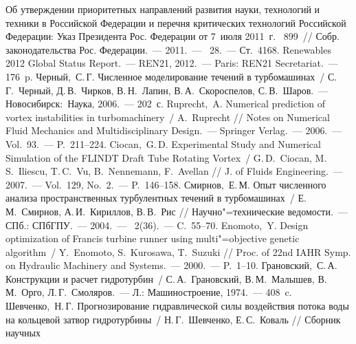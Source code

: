 \begin{thebibliography}{999}
\baselineskip 21pt

\Rus
{}Об утверждении приоритетных направлений развития науки, технологий и техники в 
                Российской Федерации и перечня критических технологий Российской Федерации: Указ 
                Президента Рос. Федерации от 7~июля 2011~г. \No~899~// Собр. законодательства Рос. 
                Федерации.~--- 2011.~--- \No~28.~--- Ст.~4168.
\Eng
{}Renewables 2012 Global Status Report.~--- REN21, 2012.~--- Paris: 
                REN21 Secretariat.~--- 176~p. 
%
\Rus
{}  Черный,~С.\,Г. Численное моделирование течений в турбомашинах~/ С.\,Г.~Черный, Д.\,В.~Чирков, 
                В.\,Н.~Лапин, В.\,А.~Скороспелов, С.\,В.~Шаров.~--- Новосибирск:~Наука, 2006.~--- 202~с.
%
\Eng
{}  Ruprecht,~A. Numerical prediction of vortex instabilities in turbomachinery~/ A.~Ruprecht // 
                Notes on Numerical Fluid Mechanics and Multidisciplinary Design.~--- Springer Verlag.~--- 
                2006.~--- Vol.~93.~--- P.~211--224.
%
\Eng
{} Ciocan,~G.\,D. Experimental Study and Numerical Simulation of the FLINDT Draft Tube 
                Rotating Vortex~/ G.\,D.~Ciocan, M.\,S.~Iliescu, T.\,C.~Vu, B.~Nennemann, F.~Avellan //
                J. of Fluids Engineering.~--- 2007.~--- Vol.~129, No.~2.~--- P.~146--158.
%
\Rus
{}  Смирнов,~Е.\,М. Опыт численного анализа пространственных турбулентных течений в 
                турбомашинах~/ Е.\,М.~Смирнов, А.\,И.~Кириллов, В.\,В.~Рис // Научно"=технические 
                ведомости.~--- СПб.: СПбГПУ.~--- 2004.~--- \No~2(36).~--- C.~55--70.
%
\Eng
{}  Enomoto,~Y. Design optimization of Francis turbine runner using 
                multi"=objective genetic algorithm~/ Y.~Enomoto, S.~Kurosawa, T.~Suzuki // Proc. of 22nd 
                IAHR Symp. on Hydraulic Machinery and Systems.~--- 2000.~--- P.~1--10.
%
\Rus
{} Грановский,~С.\,А. Конструкции и расчет гидротурбин~/ С.\,А.~Грановский, 
                    В.\,М.~Малышев, В.\,М.~Орго, Л.\,Г.~Смоляров.~--- Л.: Машиностроение, 1974.~--- 408~c.
%
\Rus
{} Шевченко,~Н.\,Г. Прогнозирование гидравлической силы воздействия потока воды на
                 кольцевой затвор гидротурбины~/ Н.\,Г.~Шевченко, Е.\,С.~Коваль // Сборник научных 

\end{thebibliography}

